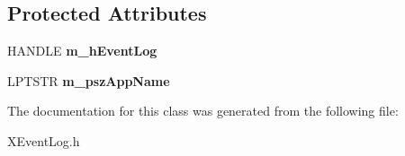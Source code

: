 \subsection*{Protected Attributes}
\begin{DoxyCompactItemize}
\item 
\hypertarget{classCXEventLog_a5ab10fd56f96ac16dc30c55261fcaeeb}{H\-A\-N\-D\-L\-E {\bfseries m\-\_\-h\-Event\-Log}}\label{classCXEventLog_a5ab10fd56f96ac16dc30c55261fcaeeb}

\item 
\hypertarget{classCXEventLog_a2794de5da01eef9dba2147d3200ab64e}{L\-P\-T\-S\-T\-R {\bfseries m\-\_\-psz\-App\-Name}}\label{classCXEventLog_a2794de5da01eef9dba2147d3200ab64e}

\end{DoxyCompactItemize}


The documentation for this class was generated from the following file\-:\begin{DoxyCompactItemize}
\item 
X\-Event\-Log.\-h\end{DoxyCompactItemize}
